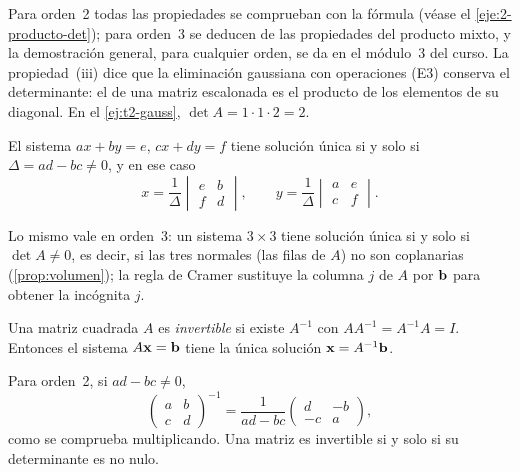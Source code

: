 Para orden~2 todas las propiedades se comprueban con la fórmula (véase el \cref{eje:2-producto-det}); para orden~3 se deducen de las propiedades del producto mixto, y la demostración general, para cualquier orden, se da en el módulo~3 del curso. La propiedad~(iii) dice que la eliminación gaussiana con operaciones (E3) conserva el determinante: el de una matriz escalonada es el producto de los elementos de su diagonal. En el \cref{ej:t2-gauss}, $\det A=1\cdot1\cdot2=2$.

\begin{teorema}\label{teo:cramer}
El sistema $ax+by=e$, $cx+dy=f$ tiene solución única si y solo si $\Delta=ad-bc\neq0$, y en ese caso
\[
x=\frac{1}{\Delta}\begin{vmatrix}e&b\\f&d\end{vmatrix},\qquad y=\frac{1}{\Delta}\begin{vmatrix}a&e\\c&f\end{vmatrix}.
\]
\end{teorema}

Lo mismo vale en orden~3: un sistema $3\times3$ tiene solución única si y solo si $\det A\neq0$, es decir, si las tres normales (las filas de $A$) no son coplanarias (\cref{prop:volumen}); la regla de Cramer sustituye la columna $j$ de $A$ por $\mathbf{b}$ para obtener la incógnita $j$.

\begin{definicion}\label{def:inversa}
Una matriz cuadrada $A$ es \emph{invertible} si existe $A^{-1}$ con $AA^{-1}=A^{-1}A=I$. Entonces el sistema $A\mathbf{x}=\mathbf{b}$ tiene la única solución $\mathbf{x}=A^{-1}\mathbf{b}$.
\end{definicion}

Para orden~2, si $ad-bc\neq0$,
\begin{equation}\label{eq:t2-inversa}
\begin{pmatrix}a&b\\c&d\end{pmatrix}^{-1}=\frac{1}{ad-bc}\begin{pmatrix}d&-b\\-c&a\end{pmatrix},
\end{equation}
como se comprueba multiplicando. Una matriz es invertible si y solo si su determinante es no nulo.

\addtocounter{definicion}{1}%

\addtocounter{definicion}{1}%

